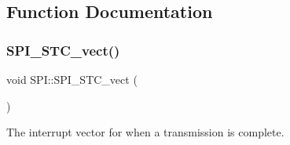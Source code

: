 \subsection{Function Documentation}
\hypertarget{namespace_s_p_i_ae2f79145ecdd9d5f82d31283a4fcf80f}{}\label{namespace_s_p_i_ae2f79145ecdd9d5f82d31283a4fcf80f} 
\subsubsection{\texorpdfstring{S\+P\+I\+\_\+\+S\+T\+C\+\_\+vect()}{SPI\_STC\_vect()}}
{\footnotesize\ttfamily void S\+P\+I\+::\+S\+P\+I\+\_\+\+S\+T\+C\+\_\+vect (\begin{DoxyParamCaption}{ }\end{DoxyParamCaption})}

The interrupt vector for when a transmission is complete. 